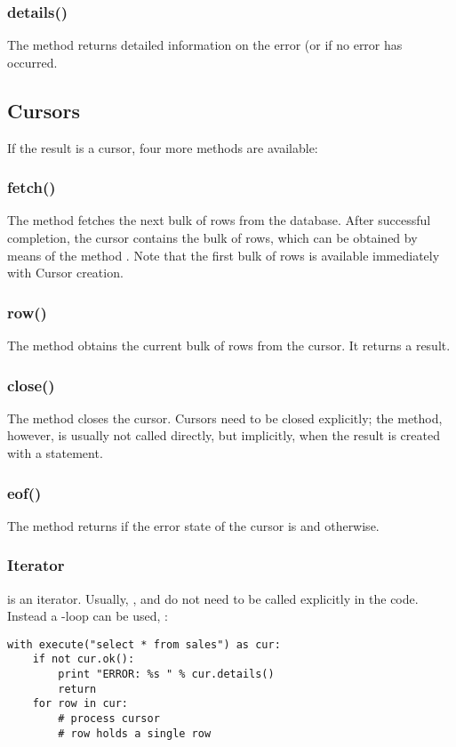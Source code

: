 \subsubsection{details()}
The method returns
detailed information on the error
(or  if no error has occurred.

\subsection{Cursors}
If the result is a cursor,
four more methods are available:

\subsubsection{fetch()}
The method fetches the next bulk
of rows from the database.
After successful completion,
the cursor contains the bulk
of rows, which can be obtained by means of
the method .
Note that the first bulk of rows
is available immediately with
Cursor creation.

\subsubsection{row()}
The method obtains the current
bulk of rows from the cursor.
It returns a  result.

\subsubsection{close()}
The method closes the cursor.
Cursors need to be closed
explicitly; the method, however,
is usually not called directly,
but implicitly, when the result
is created with a  statement.

\subsubsection{eof()}
The method returns 
if the error state of the cursor
is  and 
otherwise.

\subsubsection{Iterator}
 is an iterator.
Usually, , 
and  do not need to be called
explicitly in the code.
Instead a -loop  can be used, \eg:

\begin{python}
\begin{lstlisting}
with execute("select * from sales") as cur:
    if not cur.ok():
        print "ERROR: %s " % cur.details()
        return
    for row in cur:
        # process cursor
        # row holds a single row
\end{lstlisting}
\end{python}

